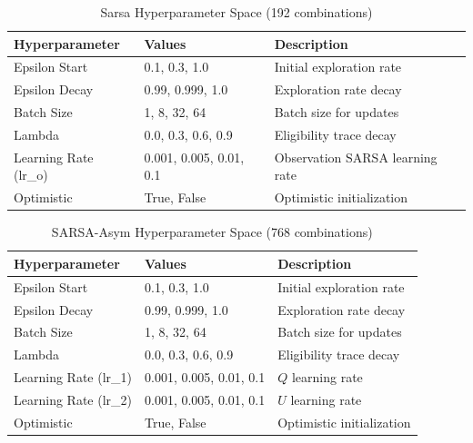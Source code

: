 \begin{table}[h]
\centering
\caption{Sarsa Hyperparameter Space (192 combinations)}
\begin{tabular}{lll}
\toprule
\textbf{Hyperparameter} & \textbf{Values} & \textbf{Description} \\
\midrule
Epsilon Start & 0.1, 0.3, 1.0 & Initial exploration rate \\
Epsilon Decay & 0.99, 0.999, 1.0 & Exploration rate decay \\
Batch Size & 1, 8, 32, 64 & Batch size for updates \\
Lambda & 0.0, 0.3, 0.6, 0.9 & Eligibility trace decay \\
Learning Rate (lr\_o) & 0.001, 0.005, 0.01, 0.1 & Observation SARSA learning rate \\
Optimistic & True, False & Optimistic initialization \\
\bottomrule
\end{tabular}
\end{table}

\begin{table}[h]
\centering
\caption{SARSA-Asym Hyperparameter Space (768 combinations)}
\begin{tabular}{lll}
\toprule
\textbf{Hyperparameter} & \textbf{Values} & \textbf{Description} \\
\midrule
Epsilon Start & 0.1, 0.3, 1.0 & Initial exploration rate \\
Epsilon Decay & 0.99, 0.999, 1.0 & Exploration rate decay \\
Batch Size & 1, 8, 32, 64 & Batch size for updates \\
Lambda & 0.0, 0.3, 0.6, 0.9 & Eligibility trace decay \\
Learning Rate (lr\_1) & 0.001, 0.005, 0.01, 0.1 & $Q$ learning rate \\
Learning Rate (lr\_2) & 0.001, 0.005, 0.01, 0.1 & $U$ learning rate \\
Optimistic & True, False & Optimistic initialization \\
\bottomrule
\end{tabular}
\end{table}


